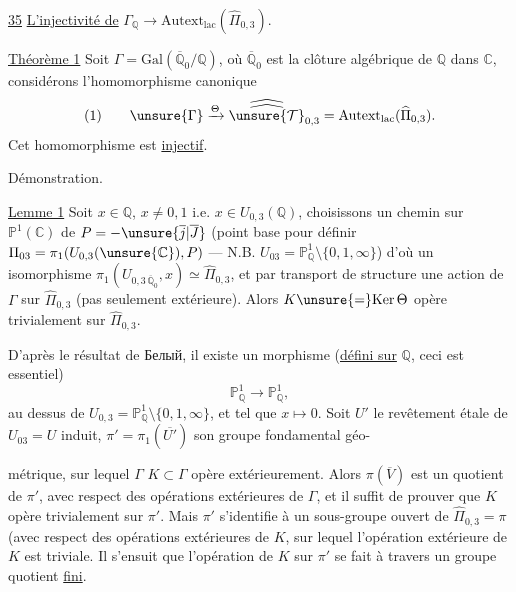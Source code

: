 
\uline{35} \uline{L'injectivité de} $\Gamma_{\mathbb Q}\longrightarrow\mathrm{Autext}_{\mathrm{lac}}(\widehat{\Pi}_{0,3})$.


\uline{Théorème 1} Soit $\Gamma=\mathrm{Gal}(\overline{\mathbb Q}_0/\mathbb Q)$, où $\overline{\mathbb Q}_0$ est la clôture algébrique de $\mathbb Q$ dans $\mathbb C$, considérons l'homomorphisme canonique
\[
(1)\qquad \unsure{\Gamma}\xrightarrow{\Theta}\widehat{\widehat{\unsure{\mathcal T}}}_{0,3}=\mathrm{Autext}_{\mathrm{lac}}(\widehat{\Pi}_{0,3}).
\]
Cet homomorphisme est \uline{injectif}.

Démonstration.

\uline{Lemme 1} Soit $x\in\mathbb Q$, $x\ne0,1$ i.e. $x\in U_{0,3}(\mathbb Q)$, choisissons un  chemin sur $\mathbb P^1(\mathbb C)$ de $P=-\unsure{\overline{j}|\overline{J}}$ (point base pour définir $\Pi_{03}=\pi_1(U_{0,3}(\unsure{\mathbb C}),P)$ --- N.B. $U_{03}=\mathbb P^1_{\mathbb Q}\setminus\{0,1,\infty\}$) d'où un isomorphisme $\pi_1(U_{0,3\,\overline{\mathbb Q}_0},x)\simeq\widehat{\Pi}_{0,3}$, et par transport de structure une action  de $\Gamma$ sur $\widehat{\Pi}_{0,3}$ (pas seulement extérieure). Alors $K\unsure{=}\mathrm{Ker}\,\Theta$ opère trivialement sur $\widehat{\Pi}_{0,3}$.

D'après le résultat de Белый, il existe un morphisme (\uline{défini sur} $\mathbb Q$, ceci est essentiel)
\[
\mathbb P^1_{\mathbb Q}\longrightarrow\mathbb P^1_{\mathbb Q},
\]
 au dessus de $U_{0,3}=\mathbb P^1_{\mathbb Q}\setminus\{0,1,\infty\}$, et tel que $x\longmapsto0$. Soit $U'$ le revêtement étale de $U_{03}=U$ induit,  $\pi'=\pi_1(\overline{U'})$ son groupe fondamental géo-


métrique, sur lequel $\Gamma$  $K\subset\Gamma$ opère extérieurement. Alors $\pi(\overline V)$ est un quotient de $\pi'$, avec respect des opérations extérieures de $\Gamma$, et il suffit de prouver que $K$ opère trivialement sur $\pi'$. Mais $\pi'$ s'identifie à un sous-groupe ouvert de $\widehat{\Pi}_{0,3}=\pi$ (avec respect des opérations extérieures de $K$, sur lequel l'opération extérieure de $K$ est triviale. Il s'ensuit que l'opération  de $K$ sur $\pi'$ se fait à travers un groupe quotient \uline{fini}.

